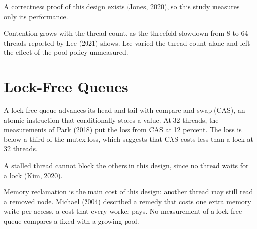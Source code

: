 \documentclass{article}
\begin{document}
A correctness proof of this design exists (Jones, 2020), so this study measures only its performance.

Contention grows with the thread count, as the threefold slowdown from 8 to 64 threads reported by Lee (2021) shows. Lee varied the thread count alone and left the effect of the pool policy unmeasured.

\section{Lock-Free Queues}

A lock-free queue advances its head and tail with compare-and-swap (CAS), an atomic instruction that conditionally stores a value. At 32 threads, the measurements of Park (2018) put the loss from CAS at 12 percent. The loss is below a third of the mutex loss, which suggests that CAS costs less than a lock at 32 threads.

A stalled thread cannot block the others in this design, since no thread waits for a lock (Kim, 2020).

Memory reclamation is the main cost of this design: another thread may still read a removed node. Michael (2004) described a remedy that costs one extra memory write per access, a cost that every worker pays. No measurement of a lock-free queue compares a fixed with a growing pool.


\end{document}
